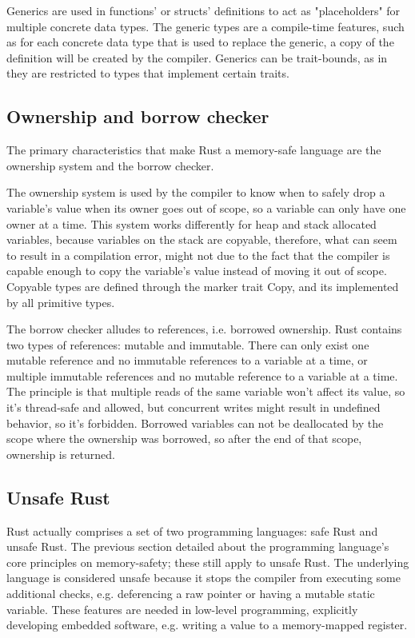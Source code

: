 \documentclass[12pt,a4paper]{report}
\begin{document}
Generics are used in functions' or structs' definitions to act as "placeholders" for multiple concrete data types. The generic types are a compile-time features, such as for each concrete data type that is used to replace the generic, a copy of the definition will be created by the compiler. Generics can be trait-bounds, as in they are restricted to types that implement certain traits.

\subsection{Ownership and borrow checker}

The primary characteristics that make Rust a memory-safe language are the ownership system and the borrow checker.

The ownership system is used by the compiler to know when to safely drop a variable's value when its owner goes out of scope, so a variable can only have one owner at a time. This system works differently for heap and stack allocated variables, because variables on the stack are copyable, therefore, what can seem to result in a compilation error, might not due to the fact that the compiler is capable enough to copy the variable's value instead of moving it out of scope. Copyable types are defined through the marker trait Copy, and its implemented by all primitive types.

The borrow checker alludes to references, i.e. borrowed ownership. Rust contains two types of references: mutable and immutable. There can only exist one mutable reference and no immutable references to a variable at a time, or multiple immutable references and no mutable reference to a variable at a time. The principle is that multiple reads of the same variable won't affect its value, so it's thread-safe and allowed, but concurrent writes might result in undefined behavior, so it's forbidden. Borrowed variables can not be deallocated by the scope where the ownership was borrowed, so after the end of that scope, ownership is returned.

\subsection{Unsafe Rust}

Rust actually comprises a set of two programming languages: safe Rust and unsafe Rust. The previous section detailed about the programming language's core principles on memory-safety; these still apply to unsafe Rust. The underlying language is considered unsafe because it stops the compiler from executing some additional checks, e.g. deferencing a raw pointer or having a mutable static variable. These features are needed in low-level programming, explicitly developing embedded software, e.g. writing a value to a memory-mapped register.
\end{document}
